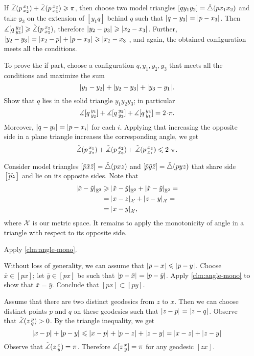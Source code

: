 If $\tilde\measuredangle(p\,{}^{x_1}_{x_2})+\tilde\measuredangle(p\,{}^{x_2}_{x_3})\geqslant \pi$, then choose two model triangles $[qy_1y_2]=\tilde\triangle(px_1x_2)$
and take $y_3$ on the extension of $[y_1q]$ behind $q$ such that $|{q}-{y_3}|_{}^{{}}=|{p}-{x_3}|_{}^{{}}$.
Then $\measuredangle [q\,{}^{y_2}_{y_3}]\geqslant \tilde\measuredangle(p\,{}^{x_2}_{x_3})$, therefore $|{y_2}-{y_3}|_{}^{{}}\geqslant |{x_2}-{x_3}|_{}^{{}}$.
Further, $|{y_2}-{y_3}|_{}^{{}}=|{x_2}-{p}|_{}^{{}}+|{p}-{x_3}|_{}^{{}} \geqslant |{x_2}-{x_3}|_{}^{{}}$,
and again, the obtained configuration meets all the conditions.

To prove the if part, choose a configuration $q,y_1,y_2,y_3$ that meets all the conditions and maximize the sum
\[|{y_1}-{y_2}|_{}^{{}}+|{y_2}-{y_3}|_{}^{{}}+|{y_3}-{y_1}|_{}^{{}}.\]
Show that $q$ lies in the solid triangle $y_1y_2y_3$;
in particular 
\[\mangle \hinge q{y_1}{y_2}+\mangle \hinge q{y_2}{y_3}+ \mangle \hinge q{y_3}{y_1}=2\cdot\pi.\]
Moreover, $|{q}-{y_i}|_{}^{{}}=|{p}-{x_i}|_{}^{{}}$ for each $i$.
Applying that increasing the opposite side in a plane triangle increases the corresponding angle, we get 
\[\angk  p{x_1}{x_2}+\angk p{x_2}{x_3}+\angk p{x_3}{x_1}
\le 
2\cdot\pi.
\]

Consider model triangles $[\tilde p\tilde x\tilde z]=\tilde\triangle(pxz)$ and $[\tilde p\tilde y\tilde z]=\tilde\triangle(pyz)$
that share side $[\tilde p\tilde z]$ and lie on its opposite sides.
Note that 
\begin{align*}
|{\tilde x}-{\tilde y}|_{\mathbb{E}^2}^{{}}
&\geqslant |{\tilde x}-{\tilde y}|_{\mathbb{E}^2}^{{}}+|{\tilde x}-{\tilde y}|_{\mathbb{E}^2}^{{}}=
\\
&=|{x}-{z}|_{\mathcal{X}}^{{}}+|{z}-{y}|_{\mathcal{X}}^{{}}=
\\
&=|{x}-{y}|_{\mathcal{X}}^{{}},
\end{align*}
where $\mathcal{X}$ is our metric space.
It remains to apply the monotonicity of angle in a triangle with respect to its opposite side. 


Apply \ref{clm:angle-mono}.

Without loss of generality, we can assume that $|{p}-{x}|_{}^{{}}\leqslant |{p}-{y}|_{}^{{}}$.
Choose $\bar x\in [px]$;
let $\bar y\in [px]$ be such that $|{p}-{\bar x}|_{}^{{}}=|{p}-{\bar y}|_{}^{{}}$.
Apply \ref{clm:angle-mono} to show that $\bar x=\bar y$.
Conclude that $[px]\subset [py]$.

Assume that there are two distinct geodesics from $z$ to $x$.
Then we can choose distinct points $p$ and $q$ on these geodesics such that $|{z}-{p}|_{}^{{}}=|{z}-{q}|_{}^{{}}$.
Observe that $\tilde\measuredangle(z\,{}^{p}_{q})>0$.
By the triangle inequality, we get 
\[|{x}-{p}|_{}^{{}}+|{p}-{y}|_{}^{{}}\leqslant |{x}-{p}|_{}^{{}}+|{p}-{z}|_{}^{{}}+|{z}-{y}|_{}^{{}}=|{x}-{z}|_{}^{{}}+|{z}-{y}|_{}^{{}}\]
Observe that $\tilde\measuredangle(z\,{}^{x}_{y})=\pi$.
Therefore $\measuredangle[z\,{}^{x}_{y}]=\pi$ for any geodesic $[zx]$.

